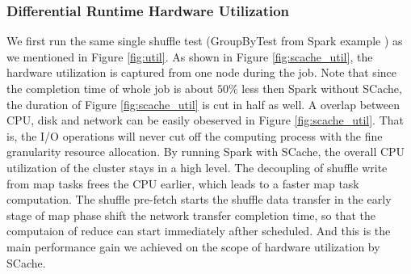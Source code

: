 \subsubsection{Differential Runtime Hardware Utilization} 
We first run the same single shuffle test (GroupByTest from Spark example \cite{sparksource}) as we mentioned in Figure \ref{fig:util}. As shown in Figure \ref{fig:scache_util}, the hardware utilization is captured from one node during the job. Note that since the completion time of whole job is about $50\%$ less then Spark without SCache, the duration of Figure \ref{fig:scache_util} is cut in half as well. A overlap between CPU, disk and network can be easily obeserved in Figure \ref{fig:scache_util}. That is, the I/O operations will never cut off the computing process with the fine granularity resource allocation. By running Spark with SCache, the overall CPU utilization of the cluster stays in a high level. The decoupling of shuffle write from map tasks frees the CPU earlier, which leads to a faster map task computation. The shuffle pre-fetch starts the shuffle data transfer in the early stage of map phase shift the network transfer completion time, so that the computaion of reduce can start immediately afther scheduled. And this is the main performance gain we achieved on the scope of hardware utilization by SCache.


